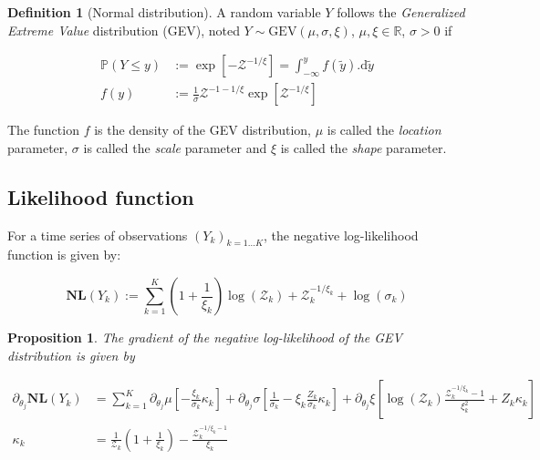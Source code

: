 \documentclass[12pt,a4paper]{article}
\theoremstyle{plain}
\newtheorem{proposition}[theorem]{Proposition}
\theoremstyle{definition}
\newtheorem{definition}{Definition}[section]
\theoremstyle{remark}
\newcommand{\PP}{\mathbb{P}}
\newcommand{\RR}{\mathbb{R}}
\newcommand{\zZ}{\mathcal{Z}}
\newcommand{\GEV}{\mathrm{GEV}}
\begin{document}
\begin{definition}[Normal distribution] A random variable $Y$ follows the
\emph{Generalized Extreme Value} distribution (GEV), noted
$Y\sim\GEV(\mu,\sigma,\xi)$, $\mu,\xi\in\RR$, $\sigma>0$ if

\[
\begin{aligned}
\PP(Y\leq y) &:= \exp\left[-\zZ^{-1/\xi}\right] =\int_{-\infty}^y f(\tilde{y}).\mathrm{d}\tilde{y}\\
f(y) &:= \frac{1}{\sigma}\zZ^{-1-1/\xi}\exp\left[\zZ^{-1/\xi}\right]
\end{aligned}
\]

\noindent The function $f$ is the density of the GEV distribution, $\mu$ is
called the \emph{location} parameter, $\sigma$ is called the \emph{scale}
parameter and $\xi$ is called the \emph{shape} parameter.

\end{definition}


\subsection{Likelihood function} %

\noindent For a time series of observations $(Y_k)_{k=1\dots K}$, the negative
log-likelihood function is given by:

\[\mathbf{NL}(Y_k):=\sum_{k=1}^K
\left(1+\frac{1}{\xi_k}\right)\log(\zZ_k) + 
\zZ_k^{-1/\xi_k} +
\log(\sigma_k)
\]

\begin{proposition} The gradient of the negative log-likelihood of the GEV
distribution is given by

\[
\begin{aligned}
\partial_{\theta_j}\mathbf{NL}(Y_k) &= \sum_{k=1}^K
\partial_{\theta_j}\mu
\left[-\frac{\xi_k}{\sigma_k}\kappa_k\right] +
\partial_{\theta_j}\sigma
\left[\frac{1}{\sigma_k}-\xi_k\frac{Z_k}{\sigma_k}\kappa_k\right] +
\partial_{\theta_j}\xi
\left[\log(\zZ_k)\frac{\zZ_k^{-1/\xi_k}-1}{\xi_k^2}+Z_k\kappa_k\right]\\
\kappa_k &=
\frac{1}{\zZ_k}\left(1+\frac{1}{\xi_k}\right)-\frac{\zZ_k^{-1/\xi_k-1}}{\xi_k}
\end{aligned}
\]
\end{proposition}
\end{document}
